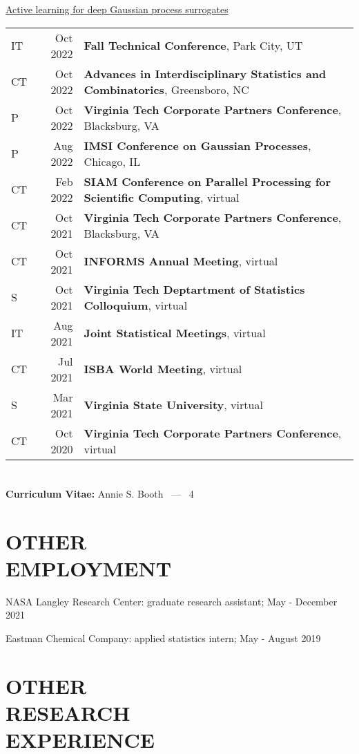 \documentclass[margin,line,11pt]{res}
\begin{document}
\begin{resume}
\underline{Active learning for deep Gaussian process surrogates}\\
\begin{tabular}{lrl}
IT & Oct 2022 & {\bf Fall Technical Conference}, Park City, UT \\
CT & Oct 2022 & {\bf Advances in Interdisciplinary Statistics and Combinatorics}, Greensboro, NC \\
P & Oct 2022 & {\bf Virginia Tech Corporate Partners Conference}, Blacksburg, VA \\
P & Aug 2022 & {\bf IMSI Conference on Gaussian Processes}, Chicago, IL \\
CT & Feb 2022 & {\bf SIAM Conference on Parallel Processing for Scientific Computing}, virtual \\
CT & Oct 2021 & {\bf Virginia Tech Corporate Partners Conference}, Blacksburg, VA \\
CT & Oct 2021 & {\bf INFORMS Annual Meeting}, virtual \\
S & Oct 2021 & {\bf Virginia Tech Deptartment of Statistics Colloquium}, virtual \\
IT & Aug 2021 & {\bf Joint Statistical Meetings}, virtual \\
CT& Jul 2021 & {\bf ISBA World Meeting}, virtual \\
S & Mar 2021 & {\bf Virginia State University}, virtual \\
CT & Oct 2020 & {\bf Virginia Tech Corporate Partners Conference}, virtual \\
\end{tabular}

\pagebreak
\section{}
\hfill {\bf Curriculum Vitae:} Annie S. Booth \  --- \  4

\medskip
\section{OTHER \\ EMPLOYMENT}

{\sc NASA Langley Research Center}: graduate research assistant; May - December 2021

{\sc Eastman Chemical Company}: applied statistics intern; May - August 2019

\medskip
\section{OTHER \\ RESEARCH \\EXPERIENCE}


\end{resume}
\end{document}
